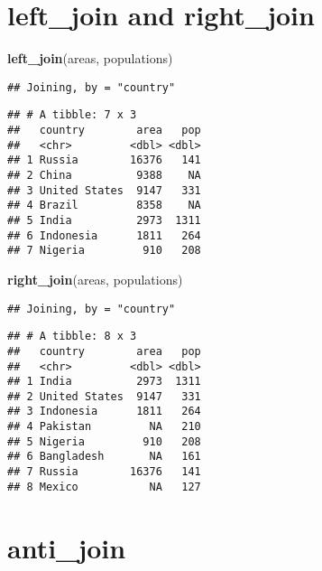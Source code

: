 \documentclass[]{book}
\newenvironment{Shaded}{\begin{snugshade}}{\end{snugshade}}
\newcommand{\KeywordTok}[1]{\textcolor[rgb]{0.13,0.29,0.53}{\textbf{#1}}}
\newcommand{\NormalTok}[1]{#1}
\begin{document}
\hypertarget{leftrightjoin}{%
\section*{\texorpdfstring{\textbf{left\_join} and \textbf{right\_join}}{left\_join and right\_join}}\label{leftrightjoin}}

\begin{Shaded}
\begin{Highlighting}[]
\KeywordTok{left_join}\NormalTok{(areas, populations)}
\end{Highlighting}
\end{Shaded}

\begin{verbatim}
## Joining, by = "country"
\end{verbatim}

\begin{verbatim}
## # A tibble: 7 x 3
##   country        area   pop
##   <chr>         <dbl> <dbl>
## 1 Russia        16376   141
## 2 China          9388    NA
## 3 United States  9147   331
## 4 Brazil         8358    NA
## 5 India          2973  1311
## 6 Indonesia      1811   264
## 7 Nigeria         910   208
\end{verbatim}

\begin{Shaded}
\begin{Highlighting}[]
\KeywordTok{right_join}\NormalTok{(areas, populations)}
\end{Highlighting}
\end{Shaded}

\begin{verbatim}
## Joining, by = "country"
\end{verbatim}

\begin{verbatim}
## # A tibble: 8 x 3
##   country        area   pop
##   <chr>         <dbl> <dbl>
## 1 India          2973  1311
## 2 United States  9147   331
## 3 Indonesia      1811   264
## 4 Pakistan         NA   210
## 5 Nigeria         910   208
## 6 Bangladesh       NA   161
## 7 Russia        16376   141
## 8 Mexico           NA   127
\end{verbatim}

\hypertarget{antijoin}{%
\section*{\texorpdfstring{\textbf{anti\_join}}{anti\_join}}\label{antijoin}}
\end{document}
